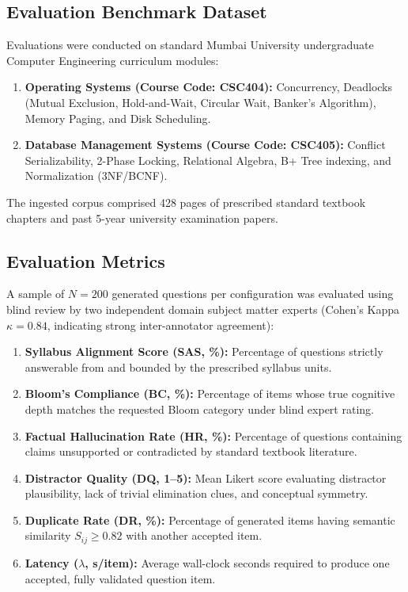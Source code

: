 \documentclass[conference]{IEEEtran}
\begin{document}
\subsection{Evaluation Benchmark Dataset}
Evaluations were conducted on standard Mumbai University undergraduate Computer Engineering curriculum modules:
\begin{enumerate}
    \item \textbf{Operating Systems (Course Code: CSC404):} Concurrency, Deadlocks (Mutual Exclusion, Hold-and-Wait, Circular Wait, Banker's Algorithm), Memory Paging, and Disk Scheduling.
    \item \textbf{Database Management Systems (Course Code: CSC405):} Conflict Serializability, 2-Phase Locking, Relational Algebra, B+ Tree indexing, and Normalization (3NF/BCNF).
\end{enumerate}
The ingested corpus comprised 428 pages of prescribed standard textbook chapters and past 5-year university examination papers.

\subsection{Evaluation Metrics}
A sample of $N=200$ generated questions per configuration was evaluated using blind review by two independent domain subject matter experts (Cohen's Kappa $\kappa = 0.84$, indicating strong inter-annotator agreement):
\begin{enumerate}
    \item \textbf{Syllabus Alignment Score (SAS, \%):} Percentage of questions strictly answerable from and bounded by the prescribed syllabus units.
    \item \textbf{Bloom's Compliance (BC, \%):} Percentage of items whose true cognitive depth matches the requested Bloom category under blind expert rating.
    \item \textbf{Factual Hallucination Rate (HR, \%):} Percentage of questions containing claims unsupported or contradicted by standard textbook literature.
    \item \textbf{Distractor Quality (DQ, 1--5):} Mean Likert score evaluating distractor plausibility, lack of trivial elimination clues, and conceptual symmetry.
    \item \textbf{Duplicate Rate (DR, \%):} Percentage of generated items having semantic similarity $S_{ij} \ge 0.82$ with another accepted item.
    \item \textbf{Latency ($\lambda$, s/item):} Average wall-clock seconds required to produce one accepted, fully validated question item.
\end{enumerate}
\end{document}
